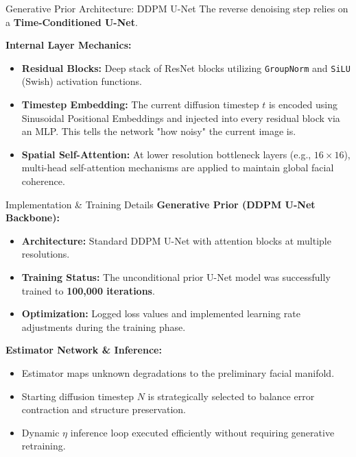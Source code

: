 \documentclass[aspectratio=169]{beamer}
\begin{document}
\begin{frame}{Generative Prior Architecture: DDPM U-Net}
    The reverse denoising step relies on a \textbf{Time-Conditioned U-Net}.
    
    \vspace{0.2cm}
    \textbf{Internal Layer Mechanics:}
    \begin{itemize}
        \item \textbf{Residual Blocks:} Deep stack of ResNet blocks utilizing \texttt{GroupNorm} and \texttt{SiLU} (Swish) activation functions.
        \item \textbf{Timestep Embedding:} The current diffusion timestep $t$ is encoded using Sinusoidal Positional Embeddings and injected into every residual block via an MLP. This tells the network "how noisy" the current image is.
        \item \textbf{Spatial Self-Attention:} At lower resolution bottleneck layers (e.g., $16 \times 16$), multi-head self-attention mechanisms are applied to maintain global facial coherence.
    \end{itemize}
\end{frame}

\begin{frame}{Implementation \& Training Details}
    \textbf{Generative Prior (DDPM U-Net Backbone):}
    \begin{itemize}
        \item \textbf{Architecture:} Standard DDPM U-Net with attention blocks at multiple resolutions.
        \item \textbf{Training Status:} The unconditional prior U-Net model was successfully trained to \textbf{100,000 iterations}.
        \item \textbf{Optimization:} Logged loss values and implemented learning rate adjustments during the training phase.
    \end{itemize}
    
    \textbf{Estimator Network \& Inference:}
    \begin{itemize}
        \item Estimator maps unknown degradations to the preliminary facial manifold.
        \item Starting diffusion timestep $N$ is strategically selected to balance error contraction and structure preservation.
        \item Dynamic $\eta$ inference loop executed efficiently without requiring generative retraining.
    \end{itemize}
\end{frame}
\end{document}
